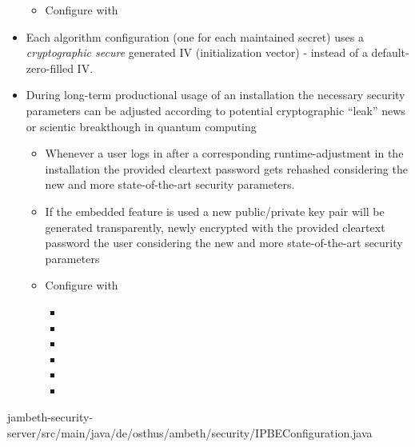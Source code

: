 \begin{itemize}
\begin{itemize}
			\item Configure with 
		\end{itemize}
	\item Each algorithm configuration (one for each maintained secret) uses a \textit{cryptographic secure} generated IV (initialization vector) - instead of a default-zero-filled IV.
	\item During long-term productional usage of an \AMBETH{} installation the necessary security parameters can be adjusted according to potential cryptographic ``leak'' news or scientic breakthough in quantum computing
		\begin{itemize}
			\item Whenever a user logs in after a corresponding runtime-adjustment in the \AMBETH{} installation the provided cleartext password gets rehashed considering the new and more state-of-the-art security parameters.
			\item If the embedded  feature is used a new public/private key pair will be generated transparently, newly encrypted with the provided cleartext password the user considering the new and more state-of-the-art security parameters
			\item Configure with
				\begin{itemize}
					\item {}
					\item {}
					\item {}
					\item {}
					\item {}
					\item {}
				\end{itemize}	
		\end{itemize}	
\end{itemize}


	{jambeth-security-server/src/main/java/de/osthus/ambeth/security/IPBEConfiguration.java}
